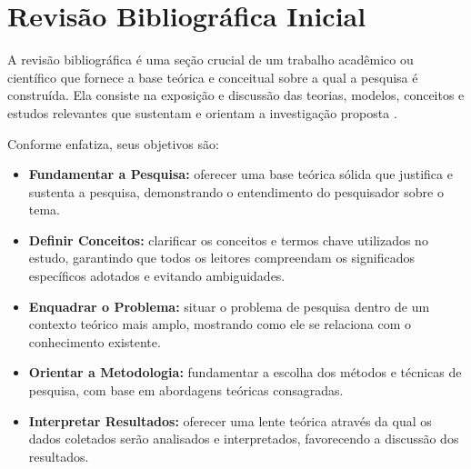 \section{Revisão Bibliográfica Inicial}\label{sec:revisao_bib}

A revisão bibliográfica é uma seção crucial de um trabalho acadêmico ou científico que fornece a base teórica e conceitual sobre a qual a pesquisa é construída. Ela consiste na exposição e discussão das teorias, modelos, conceitos e estudos relevantes que sustentam e orientam a investigação proposta \cite{Marconi2022}.

Conforme  enfatiza, seus objetivos são:
\begin{itemize}[itemsep=0pt, leftmargin=2.5cm]
    \item \textbf{Fundamentar a Pesquisa:} oferecer uma base teórica sólida que justifica e sustenta a pesquisa, demonstrando o entendimento do pesquisador sobre o tema.
    \item \textbf{Definir Conceitos:} clarificar os conceitos e termos chave utilizados no estudo, garantindo que todos os leitores compreendam os significados específicos adotados e evitando ambiguidades.
    \item \textbf{Enquadrar o Problema:} situar o problema de pesquisa dentro de um contexto teórico mais amplo, mostrando como ele se relaciona com o conhecimento existente.
    \item \textbf{Orientar a Metodologia:} fundamentar a escolha dos métodos e técnicas de pesquisa, com base em abordagens teóricas consagradas.
    \item \textbf{Interpretar Resultados:} oferecer uma lente teórica através da qual os dados coletados serão analisados e interpretados, favorecendo a discussão dos resultados.
\end{itemize}

